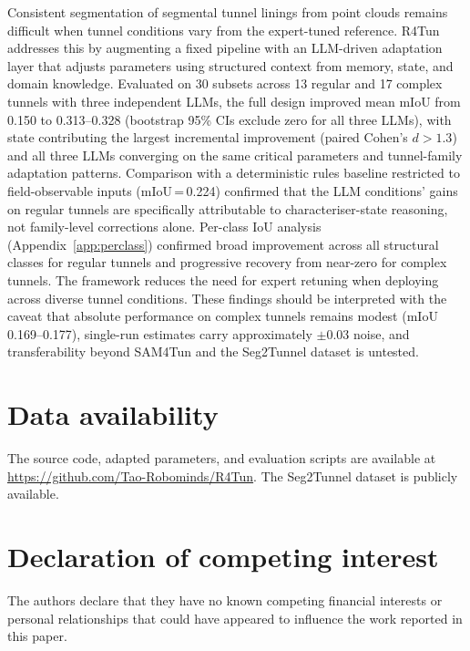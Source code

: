 \documentclass[a4paper,fleqn]{cas-dc}
\begin{document}
Consistent segmentation of segmental tunnel linings from point clouds remains difficult when tunnel conditions vary from the expert-tuned reference. R4Tun addresses this by augmenting a fixed pipeline with an LLM-driven adaptation layer that adjusts parameters using structured context from memory, state, and domain knowledge. Evaluated on 30 subsets across 13 regular and 17 complex tunnels with three independent LLMs, the full design improved mean mIoU from 0.150 to 0.313--0.328 (bootstrap 95\% CIs exclude zero for all three LLMs), with state contributing the largest incremental improvement (paired Cohen's $d > 1.3$) and all three LLMs converging on the same critical parameters and tunnel-family adaptation patterns. Comparison with a deterministic rules baseline restricted to field-observable inputs (mIoU\,=\,0.224) confirmed that the LLM conditions' gains on regular tunnels are specifically attributable to characteriser-state reasoning, not family-level corrections alone. Per-class IoU analysis (Appendix~\ref{app:perclass}) confirmed broad improvement across all structural classes for regular tunnels and progressive recovery from near-zero for complex tunnels. The framework reduces the need for expert retuning when deploying across diverse tunnel conditions. These findings should be interpreted with the caveat that absolute performance on complex tunnels remains modest (mIoU 0.169--0.177), single-run estimates carry approximately $\pm 0.03$ noise, and transferability beyond SAM4Tun and the Seg2Tunnel dataset is untested.


\section*{Data availability}

The source code, adapted parameters, and evaluation scripts are available at \url{https://github.com/Tao-Robominds/R4Tun}. The Seg2Tunnel dataset is publicly available.

\section*{Declaration of competing interest}

The authors declare that they have no known competing financial interests or personal relationships that could have appeared to influence the work reported in this paper.
\end{document}
